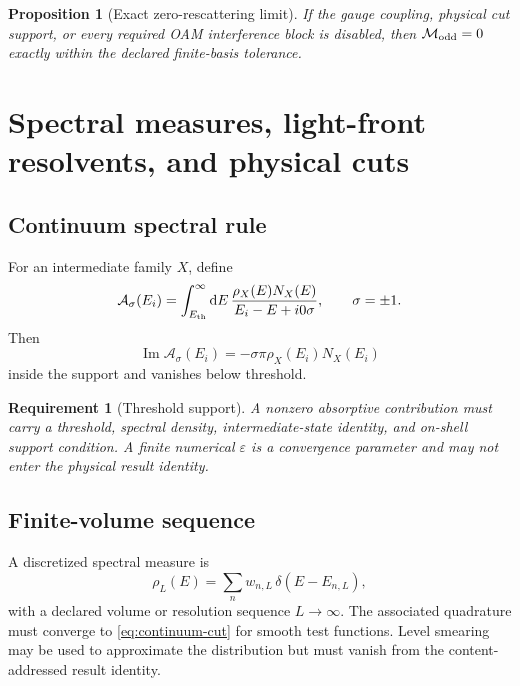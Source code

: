 \documentclass[11pt]{article}
\newtheorem{requirement}[definition]{Requirement}
\newtheorem{proposition}[definition]{Proposition}
\newcommand{\dd}{\mathrm{d}}
\newcommand{\cM}{\mathcal M}
\newcommand{\cA}{\mathcal A}
\newcommand{\eps}{\varepsilon}
\begin{document}
\begin{proposition}[Exact zero-rescattering limit]
If the gauge coupling, physical cut support, or every required OAM
interference block is disabled, then \(\cM_{\rm odd}=0\) exactly within the
declared finite-basis tolerance.
\end{proposition}

\section{Spectral measures, light-front resolvents, and physical cuts}
\label{sec:spectral}

\subsection{Continuum spectral rule}

For an intermediate family \(X\), define
\begin{equation}
 \cA_\sigma(E_i)
 =
 \int_{E_{\rm th}}^\infty
 \dd E\,
 \frac{\rho_X(E)N_X(E)}{E_i-E+i0\sigma},
 \qquad \sigma=\pm1.
 \label{eq:continuum-amplitude}
\end{equation}
Then
\begin{equation}
 \operatorname{Im}\cA_\sigma(E_i)
 =-\sigma\pi\rho_X(E_i)N_X(E_i)
 \label{eq:continuum-cut}
\end{equation}
inside the support and vanishes below threshold.

\begin{requirement}[Threshold support]
A nonzero absorptive contribution must carry a threshold, spectral density,
intermediate-state identity, and on-shell support condition.  A finite
numerical \(\eps\) is a convergence parameter and may not enter the physical
result identity.
\end{requirement}

\subsection{Finite-volume sequence}

A discretized spectral measure is
\begin{equation}
 \rho_L(E)
 =\sum_n w_{n,L}\,\delta(E-E_{n,L}),
 \label{eq:finite-volume-measure}
\end{equation}
with a declared volume or resolution sequence \(L\to\infty\).  The associated
quadrature must converge to \cref{eq:continuum-cut} for smooth test functions.
Level smearing may be used to approximate the distribution but must vanish
from the content-addressed result identity.
\end{document}
